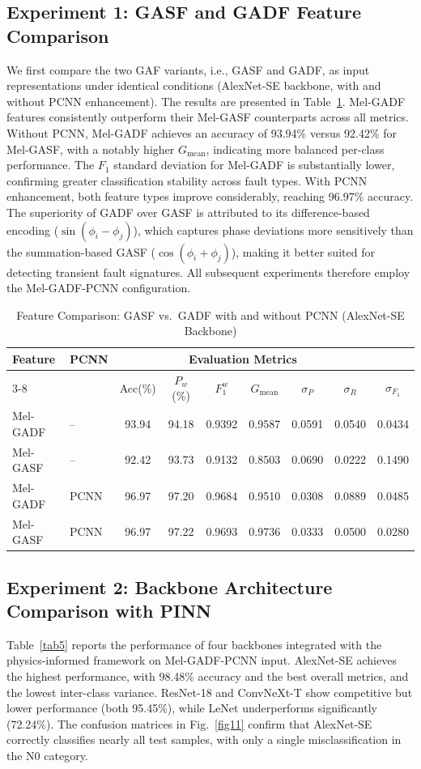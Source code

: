 \documentclass[twocolumn,iicol,pdflatex,sn-mathphys-num]{sn-jnl}%
\begin{document}
\subsection{Experiment 1: GASF and GADF Feature Comparison}
We first compare the two GAF variants, i.e., GASF and GADF, as input representations under identical conditions (AlexNet-SE backbone, with and without PCNN enhancement). The results are presented in Table~\ref{tab4}. Mel-GADF features consistently outperform their Mel-GASF counterparts across all metrics. Without PCNN, Mel-GADF achieves an accuracy of 93.94\% versus 92.42\% for Mel-GASF, with a notably higher $G_{\text{mean}}$, indicating more balanced per-class performance. The $F_1$ standard deviation for Mel-GADF is substantially lower, confirming greater classification stability across fault types. With PCNN enhancement, both feature types improve considerably, reaching 96.97\% accuracy. The superiority of GADF over GASF is attributed to its difference-based encoding ($\sin(\phi_i - \phi_j)$), which captures phase deviations more sensitively than the summation-based GASF ($\cos(\phi_i + \phi_j)$), making it better suited for detecting transient fault signatures. All subsequent experiments therefore employ the Mel-GADF-PCNN configuration.
\begin{table}[ht]
	\centering
	\caption{Feature Comparison: GASF vs.\ GADF with and without PCNN (AlexNet-SE Backbone)}
	\label{tab4}
	\begin{tabular}{l l c c c c c c c}
		\toprule
		\multirow{2}{*}{Feature} & \multirow{2}{*}{PCNN} & \multicolumn{6}{c}{Evaluation Metrics} \\
		\cmidrule(lr){3-8}	
		&  & Acc(\%) & $P_w$(\%) & $F_1^w$ & $G_{\text{mean}}$ & $\sigma_{P}$ & $\sigma_{R}$ & $\sigma_{F_1}$ \\
		\midrule
		Mel-GADF & --   & 93.94 & 94.18 & 0.9392 & 0.9587 & 0.0591 & 0.0540 & 0.0434 \\
		Mel-GASF & --   & 92.42 & 93.73 & 0.9132 & 0.8503 & 0.0690 & 0.0222 & 0.1490 \\
		\midrule
		Mel-GADF & PCNN & 96.97 & 97.20 & 0.9684 & 0.9510 & 0.0308 & 0.0889 & 0.0485 \\
		Mel-GASF & PCNN & 96.97 & 97.22 & 0.9693 & 0.9736 & 0.0333 & 0.0500 & 0.0280 \\
		\bottomrule
	\end{tabular}
\end{table}

\subsection{Experiment 2: Backbone Architecture Comparison with PINN}
Table~\ref{tab5} reports the performance of four backbones integrated with the physics-informed framework on Mel-GADF-PCNN input. AlexNet-SE achieves the highest performance, with 98.48\% accuracy and the best overall metrics, and the lowest inter-class variance. ResNet-18 and ConvNeXt-T show competitive but lower performance (both 95.45\%), while LeNet underperforms significantly (72.24\%). The confusion matrices in Fig.~\ref{fig11} confirm that AlexNet-SE correctly classifies nearly all test samples, with only a single misclassification in the N0 category.
\end{document}

